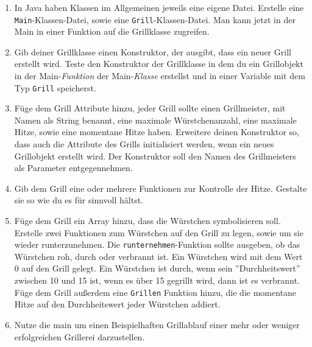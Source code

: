 \documentclass{../../sheet}
\begin{document}
\begin{enumerate}
    \item In Java haben Klassen im Allgemeinen jeweils eine eigene Datei. Erstelle eine \texttt{Main}-Klassen-Datei, sowie eine \texttt{Grill}-Klassen-Datei. Man kann jetzt in der Main in einer Funktion auf die Grillklasse zugreifen. 
    \item Gib deiner Grillklasse einen Konstruktor, der ausgibt, dass ein neuer Grill erstellt wird. Teste den Konstruktor der Grillklasse in dem du ein Grillobjekt in der Main-\textit{Funktion} der Main-\textit{Klasse} erstellst und in einer Variable mit dem Typ \texttt{Grill} speicherst.
    \item Füge dem Grill Attribute hinzu, jeder Grill sollte einen Grillmeister, mit Namen als String benannt, eine maximale Würstchenanzahl, eine maximale Hitze, sowie eine momentane Hitze haben. Erweitere deinen Konstruktor so, dass auch die Attribute des Grills initialisiert werden, wenn ein neues Grillobjekt erstellt wird. Der Konstruktor soll den Namen des Grillmeisters als Parameter entgegennehmen.
    \item Gib dem Grill eine oder mehrere Funktionen zur Kontrolle der Hitze. Gestalte sie so wie du es für sinnvoll hältst.
    \item Füge dem Grill ein Array hinzu, dass die Würstchen symbolisieren soll. Erstelle zwei Funktionen zum Würstchen auf den Grill zu legen, sowie um sie wieder runterzunehmen. Die \texttt{runternehmen}-Funktion sollte ausgeben, ob das Würstchen roh, durch oder verbrannt ist. Ein Würstchen wird mit dem Wert 0 auf den Grill gelegt. Ein Würstchen ist durch, wenn sein ''Durchheitswert'' zwischen 10 und 15 ist, wenn es über 15 gegrillt wird, dann ist es verbrannt. \\
    Füge dem Grill außerdem eine \texttt{Grillen} Funktion hinzu, die die momentane Hitze auf den Durchheitswert jeder Würstchen addiert.
    \item Nutze die main um einen Beispielhaften Grillablauf einer mehr oder weniger erfolgreichen Grillerei darzustellen. 
\end{enumerate}
\end{document}
